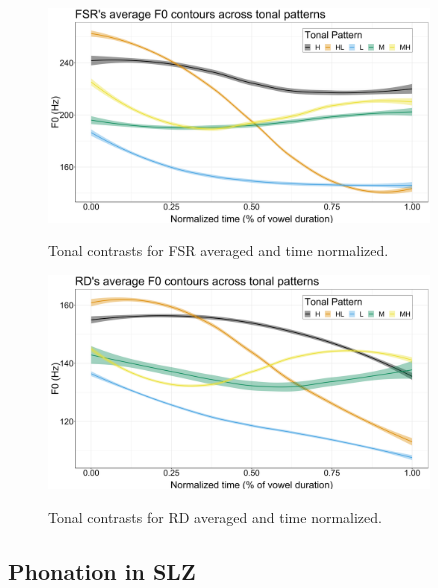 \documentclass[12pt, letterpaper]{article}
\begin{document}
\begin{figure}[!ht]
	\centering
	\includegraphics[width=0.9\textwidth]{../FSRTonePlot.png}
	\label{fig:FSRTonePlot}
	\caption{Tonal contrasts for FSR averaged and time normalized.}
\end{figure}

\begin{figure}[!ht]
	\centering
	\includegraphics[width=0.9\textwidth]{../RDTonePlot.png}
	\label{fig:RDTonePlot}
	\caption{Tonal contrasts for RD averaged and time normalized.}
\end{figure}


\subsection{Phonation in SLZ} \label{sec:Phonation}
\end{document}

